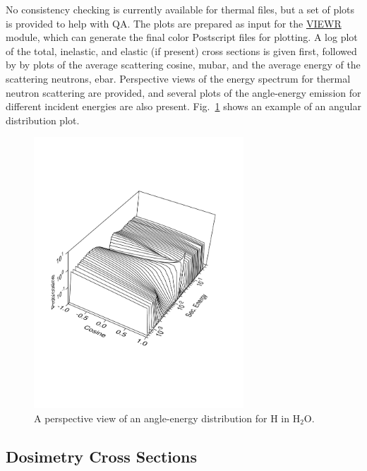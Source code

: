 No consistency checking is currently available for thermal files,
but a set of plots is provided to help with QA.
  The plots are prepared as input
for the \hyperlink{sVIEWRhy}{VIEWR} module, which can generate the
final color Postscript files for plotting.  A log plot of the
total, inelastic, and elastic (if present) cross sections is
given first, followed by by plots of the average scattering cosine,
mubar, and the average energy of the scattering neutrons, ebar.
Perspective views of the energy spectrum for thermal neutron
scattering are provided, and several plots of the angle-energy
emission for different incident energies are also present.
Fig.~\ref{hh2o-ae} shows an example of an angular distribution plot.

\begin{figure}[thb]\centering
\includegraphics[keepaspectratio, height=4.0in, angle=0]{figs/hh2o-aeack}
\caption[Neutron scattering distribution from H in H$_2$O]{A perspective
 view of an angle-energy distribution for H in H$_2$O.}
\label{hh2o-ae}
\end{figure}


\subsection{Dosimetry Cross Sections}
\label{ssACER_dosimetry}

